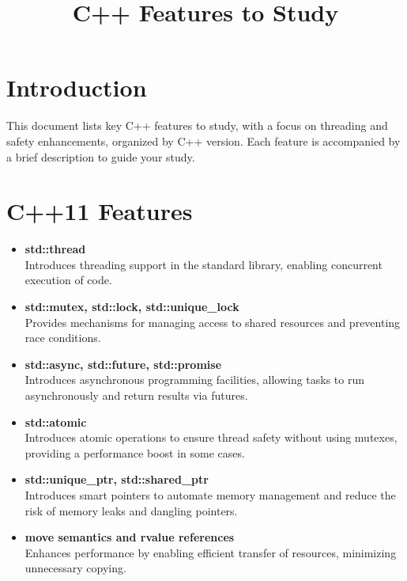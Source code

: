 \documentclass{article}
\begin{document}
\title{C++ Features to Study}
\author{}
\date{}
\maketitle

\section*{Introduction}
This document lists key C++ features to study, with a focus on threading and safety enhancements, organized by C++ version. Each feature is accompanied by a brief description to guide your study.

\section*{C++11 Features}
\begin{itemize}
    \item \textbf{std::thread} \\
    Introduces threading support in the standard library, enabling concurrent execution of code.
    
    \item \textbf{std::mutex, std::lock, std::unique\_lock} \\
    Provides mechanisms for managing access to shared resources and preventing race conditions.
    
    \item \textbf{std::async, std::future, std::promise} \\
    Introduces asynchronous programming facilities, allowing tasks to run asynchronously and return results via futures.
    
    \item \textbf{std::atomic} \\
    Introduces atomic operations to ensure thread safety without using mutexes, providing a performance boost in some cases.
    
    \item \textbf{std::unique\_ptr, std::shared\_ptr} \\
    Introduces smart pointers to automate memory management and reduce the risk of memory leaks and dangling pointers.
    
    \item \textbf{move semantics and rvalue references} \\
    Enhances performance by enabling efficient transfer of resources, minimizing unnecessary copying.
\end{itemize}
\end{document}
